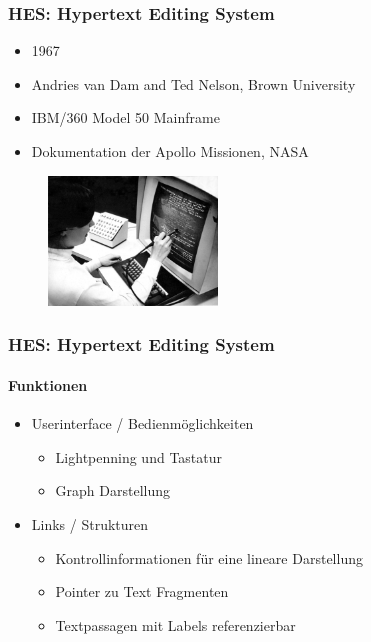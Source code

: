 \begin{frame}
\frametitle{HES: Hypertext Editing System}
\begin{itemize}
	\item 1967
	\item Andries van Dam and Ted Nelson, Brown University
	\item IBM/360 Model 50 Mainframe
	\item Dokumentation der Apollo Missionen, NASA
\end{itemize}

\begin{figure}[htbp]
	\centering
	\includegraphics[width=0.40\textwidth]{images/hes}
\end{figure}

\end{frame}

\begin{frame}
\frametitle{HES: Hypertext Editing System}
\framesubtitle{Funktionen}
	\begin{itemize}
		\item Userinterface / Bedienmöglichkeiten
		\begin{itemize}
			\item Lightpenning und Tastatur
			\item Graph Darstellung
		\end{itemize}
		\item Links / Strukturen
		\begin{itemize}
			\item Kontrollinformationen für eine lineare Darstellung
			\item Pointer zu Text Fragmenten
			\item Textpassagen mit Labels referenzierbar
		\end{itemize}
	\end{itemize}
\end{frame}

